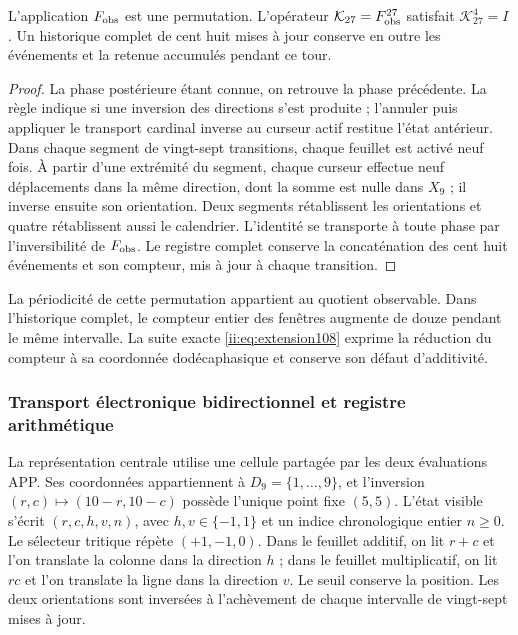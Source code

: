 \begin{proposition}
\label{ii:ii:tpk-retorno-observable}
L'application \(F_{\rm obs}\) est une permutation. L'opérateur \(\mathcal K_{27}=F_{\rm obs}^{27}\) satisfait \(\mathcal K_{27}^{4}=I\). Un historique complet de cent huit mises à jour conserve en outre les événements et la retenue accumulés pendant ce tour.
\end{proposition}
\begin{proof}
La phase postérieure étant connue, on retrouve la phase précédente. La règle indique si une inversion des directions s'est produite ; l'annuler puis appliquer le transport cardinal inverse au curseur actif restitue l'état antérieur. Dans chaque segment de vingt-sept transitions, chaque feuillet est activé neuf fois. À partir d'une extrémité du segment, chaque curseur effectue neuf déplacements dans la même direction, dont la somme est nulle dans \(X_9\) ; il inverse ensuite son orientation. Deux segments rétablissent les orientations et quatre rétablissent aussi le calendrier. L'identité se transporte à toute phase par l'inversibilité de \(F_{\rm obs}\). Le registre complet conserve la concaténation des cent huit événements et son compteur, mis à jour à chaque transition.
\end{proof}

La périodicité de cette permutation appartient au quotient observable. Dans l'historique complet, le compteur entier des fenêtres augmente de douze pendant le même intervalle. La suite exacte \eqref{ii:eq:extension108} exprime la réduction du compteur à sa coordonnée dodécaphasique et conserve son défaut d'additivité.


\subsubsection{Transport électronique bidirectionnel et registre arithmétique}
\label{ii:ii:transporte-electronico}

La représentation centrale utilise une cellule partagée par les deux
évaluations APP. Ses coordonnées appartiennent à \(D_9=\{1,\ldots,9\}\),
et l'inversion \((r,c)\mapsto(10-r,10-c)\) possède l'unique point fixe
\((5,5)\). L'état visible s'écrit \((r,c,h,v,n)\), avec
\(h,v\in\{-1,1\}\) et un indice chronologique entier \(n\geq0\).
Le sélecteur tritique répète \((+1,-1,0)\). Dans le feuillet additif, on lit
\(r+c\) et l'on translate la colonne dans la direction \(h\) ; dans le
feuillet multiplicatif, on lit \(rc\) et l'on translate la ligne dans la direction
\(v\). Le seuil conserve la position. Les deux orientations sont
inversées à l'achèvement de chaque intervalle de vingt-sept mises à jour.


